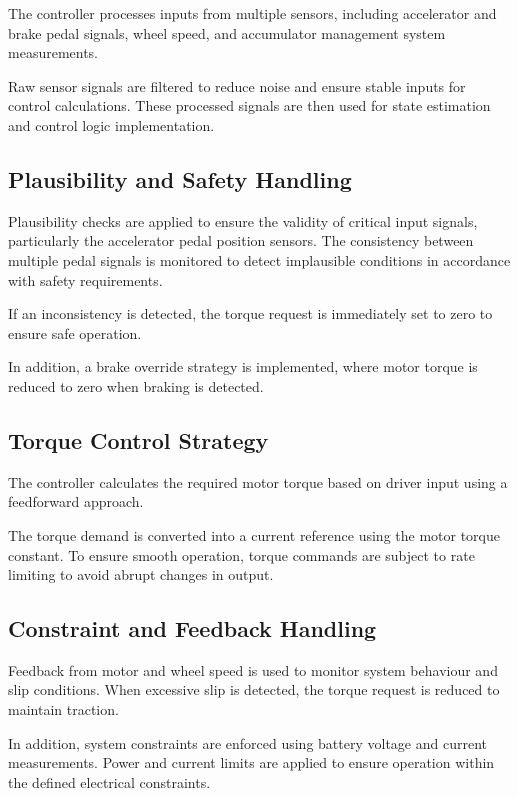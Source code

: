 \documentclass[11pt, a4paper]{report}
\numberwithin{equation}{section}
\begin{document}
The controller processes inputs from multiple sensors, including accelerator and brake pedal signals, wheel speed, and accumulator management system measurements.

Raw sensor signals are filtered to reduce noise and ensure stable inputs for control calculations. These processed signals are then used for state estimation and control logic implementation.%

\subsection{Plausibility and Safety Handling}

Plausibility checks are applied to ensure the validity of critical input signals, particularly the accelerator pedal position sensors. The consistency between multiple pedal signals is monitored to detect implausible conditions in accordance with safety requirements.

If an inconsistency is detected, the torque request is immediately set to zero to ensure safe operation.

In addition, a brake override strategy is implemented, where motor torque is reduced to zero when braking is detected.

\subsection{Torque Control Strategy}

The controller calculates the required motor torque based on driver input using a feedforward approach.

The torque demand is converted into a current reference using the motor torque constant. To ensure smooth operation, torque commands are subject to rate limiting to avoid abrupt changes in output.

\subsection{Constraint and Feedback Handling}

Feedback from motor and wheel speed is used to monitor system behaviour and slip conditions. When excessive slip is detected, the torque request is reduced to maintain traction.

In addition, system constraints are enforced using battery voltage and current measurements. Power and current limits are applied to ensure operation within the defined electrical constraints.
\end{document}
